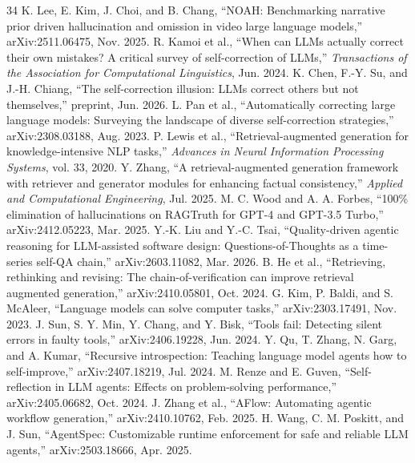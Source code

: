 \documentclass[10pt,conference]{IEEEtran}
\begin{document}
\begin{thebibliography}{34}
 K. Lee, E. Kim, J. Choi, and B. Chang, ``NOAH: Benchmarking narrative prior driven hallucination and omission in video large language models,'' arXiv:2511.06475, Nov. 2025.
 R. Kamoi et al., ``When can LLMs actually correct their own mistakes? A critical survey of self-correction of LLMs,'' \emph{Transactions of the Association for Computational Linguistics}, Jun. 2024.
 K. Chen, F.-Y. Su, and J.-H. Chiang, ``The self-correction illusion: LLMs correct others but not themselves,'' preprint, Jun. 2026.
 L. Pan et al., ``Automatically correcting large language models: Surveying the landscape of diverse self-correction strategies,'' arXiv:2308.03188, Aug. 2023.
 P. Lewis et al., ``Retrieval-augmented generation for knowledge-intensive NLP tasks,'' \emph{Advances in Neural Information Processing Systems}, vol. 33, 2020.
 Y. Zhang, ``A retrieval-augmented generation framework with retriever and generator modules for enhancing factual consistency,'' \emph{Applied and Computational Engineering}, Jul. 2025.
 M. C. Wood and A. A. Forbes, ``100\% elimination of hallucinations on RAGTruth for GPT-4 and GPT-3.5 Turbo,'' arXiv:2412.05223, Mar. 2025.
 Y.-K. Liu and Y.-C. Tsai, ``Quality-driven agentic reasoning for LLM-assisted software design: Questions-of-Thoughts as a time-series self-QA chain,'' arXiv:2603.11082, Mar. 2026.
 B. He et al., ``Retrieving, rethinking and revising: The chain-of-verification can improve retrieval augmented generation,'' arXiv:2410.05801, Oct. 2024.
 G. Kim, P. Baldi, and S. McAleer, ``Language models can solve computer tasks,'' arXiv:2303.17491, Nov. 2023.
 J. Sun, S. Y. Min, Y. Chang, and Y. Bisk, ``Tools fail: Detecting silent errors in faulty tools,'' arXiv:2406.19228, Jun. 2024.
 Y. Qu, T. Zhang, N. Garg, and A. Kumar, ``Recursive introspection: Teaching language model agents how to self-improve,'' arXiv:2407.18219, Jul. 2024.
 M. Renze and E. Guven, ``Self-reflection in LLM agents: Effects on problem-solving performance,'' arXiv:2405.06682, Oct. 2024.
 J. Zhang et al., ``AFlow: Automating agentic workflow generation,'' arXiv:2410.10762, Feb. 2025.
 H. Wang, C. M. Poskitt, and J. Sun, ``AgentSpec: Customizable runtime enforcement for safe and reliable LLM agents,'' arXiv:2503.18666, Apr. 2025.

\end{thebibliography}
\end{document}
